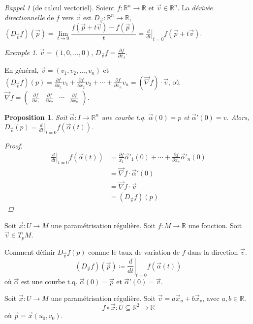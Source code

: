 \documentclass{report}
\newtheorem*{prop}{Proposition}
\theoremstyle{definition}
\theoremstyle{remark}
\newtheorem*{exem}{Exemple}
\newtheorem*{rapp}{Rappel}
\def\RR{\mathbb{R}}
\begin{document}
	\begin{rapp}[de calcul vectoriel]
		Soient $f:\RR^n\to\RR$ et $\vec v\in\RR^n$. La \emph{d\'eriv\'ee directionnelle} de $f$ vers $\vec v$ est $D_{\vec v}:\RR^n\to\RR$, $(D_{\vec v}f)(\vec p) = \lim\limits_{t\to0}\dfrac{f(\vec p+t\vec v)-f(\vec p)}{t} = \left.\frac{d}{dt}\right|_{t=0} f(\vec p+t\vec v)$.

		\begin{exem}
			$\vec v=(1,0,\dots,0)$, $D_{\vec v}f=\frac{\partial f}{\partial x_1}$.
		\end{exem}

		En g\'en\'eral, $\vec v=(v_1,v_2,\dots,v_n)$ et $(D_{\vec v}f)(p) = \frac{\partial f}{\partial x_1}v_1 + \frac{\partial f}{\partial x_2}v_2 + \cdots + \frac{\partial f}{\partial x_n}v_n = (\vec\nabla f)\cdot\vec v$, o\`u $\vec\nabla f=\begin{pmatrix}
			\frac{\partial f}{\partial x_1}&\frac{\partial f}{\partial x_2}&\cdots&\frac{\partial f}{\partial x_n}
		\end{pmatrix}$.

		\begin{prop}
			Soit $\vec\alpha:I\to\RR^n$ une courbe t.q. $\vec\alpha(0)=p$ et $\vec\alpha'(0)=v$. Alors, $D_{\vec v}(p) = \left.\frac{d}{dt}\right|_{t=0} f(\vec\alpha(t))$.
			\begin{proof}
				\begin{align*}
					\left.\frac{d}{dt}\right|_{t=0} f(\vec\alpha(t))&= \frac{\partial f}{x_1}\vec\alpha'_1(0) + \cdots + \frac{\partial f}{\partial x_n}\vec\alpha'_n(0)\\
					&= \vec\nabla f \cdot \vec\alpha'(0)\\
					&= \vec\nabla f \cdot \vec v\\
					&= (D_{\vec v}f)(p)
				\end{align*}
			\end{proof}
		\end{prop}
	\end{rapp}

	Soit $\vec x:U\to M$ une param\'etrisation r\'eguli\`ere. Soit $f:M\to\RR$ une fonction. Soit $\vec v\in T_pM$.

	Comment d\'efinir $D_{\vec v}f(p)$ comme le taux de variation de $f$ dans la direction $\vec v$.
	\[ (D_{\vec v}f)(\vec p) \coloneq \left.\frac{d}{dt}\right|_{t=0}f(\vec\alpha(t)) \] o\`u $\vec\alpha$ est une courbe t.q. $\vec\alpha(0)=\vec p$ et $\vec\alpha'(0)=\vec v$.

	Soit $\vec x:U\to M$ une param\'etrisation r\'eguli\`ere. Soit $\vec v=a\vec x_u+b\vec x_v$, avec $a,b\in\RR$.
	\[ f \circ \vec x:U\subseteq\RR^2\to\RR \] o\`u $\vec p=\vec x(u_0,v_0)$.
\end{document}
